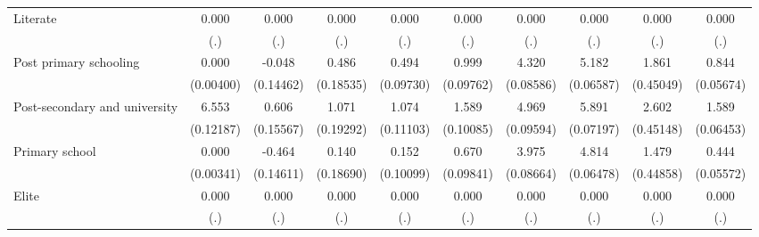 {\begin{tabular}{l*{9}{c}}
Literate            &       0.000         &       0.000         &       0.000         &       0.000         &       0.000         &       0.000         &       0.000         &       0.000         &       0.000         \\
                    &         (.)         &         (.)         &         (.)         &         (.)         &         (.)         &         (.)         &         (.)         &         (.)         &         (.)         \\
Post primary schooling&       0.000         &      -0.048         &       0.486\sym{**} &       0.494\sym{***}&       0.999\sym{***}&       4.320\sym{***}&       5.182\sym{***}&       1.861\sym{***}&       0.844\sym{***}\\
                    &   (0.00400)         &   (0.14462)         &   (0.18535)         &   (0.09730)         &   (0.09762)         &   (0.08586)         &   (0.06587)         &   (0.45049)         &   (0.05674)         \\
Post-secondary and university&       6.553\sym{***}&       0.606\sym{***}&       1.071\sym{***}&       1.074\sym{***}&       1.589\sym{***}&       4.969\sym{***}&       5.891\sym{***}&       2.602\sym{***}&       1.589\sym{***}\\
                    &   (0.12187)         &   (0.15567)         &   (0.19292)         &   (0.11103)         &   (0.10085)         &   (0.09594)         &   (0.07197)         &   (0.45148)         &   (0.06453)         \\
Primary school      &       0.000         &      -0.464\sym{**} &       0.140         &       0.152         &       0.670\sym{***}&       3.975\sym{***}&       4.814\sym{***}&       1.479\sym{***}&       0.444\sym{***}\\
                    &   (0.00341)         &   (0.14611)         &   (0.18690)         &   (0.10099)         &   (0.09841)         &   (0.08664)         &   (0.06478)         &   (0.44858)         &   (0.05572)         \\
Elite               &       0.000         &       0.000         &       0.000         &       0.000         &       0.000         &       0.000         &       0.000         &       0.000         &       0.000         \\
                    &         (.)         &         (.)         &         (.)         &         (.)         &         (.)         &         (.)         &         (.)         &         (.)         &         (.)         \\

\end{tabular}}
